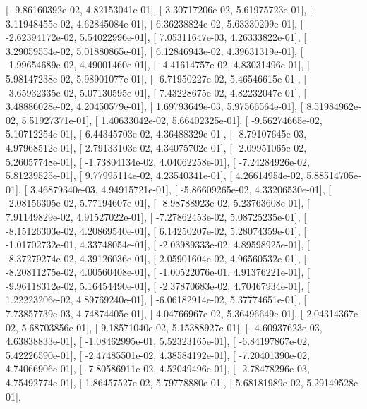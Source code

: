 \documentclass{article}
\begin{document}
       [ -9.86160392e-02,   4.82153041e-01],
       [  3.30717206e-02,   5.61975723e-01],
       [  3.11948455e-02,   4.62845084e-01],
       [  6.36238824e-02,   5.63330209e-01],
       [ -2.62394172e-02,   5.54022996e-01],
       [  7.05311647e-03,   4.26333822e-01],
       [  3.29059554e-02,   5.01880865e-01],
       [  6.12846943e-02,   4.39631319e-01],
       [ -1.99654689e-02,   4.49001460e-01],
       [ -4.41614757e-02,   4.83031496e-01],
       [  5.98147238e-02,   5.98901077e-01],
       [ -6.71950227e-02,   5.46546615e-01],
       [ -3.65932335e-02,   5.07130595e-01],
       [  7.43228675e-02,   4.82232047e-01],
       [  3.48886028e-02,   4.20450579e-01],
       [  1.69793649e-03,   5.97566564e-01],
       [  8.51984962e-02,   5.51927371e-01],
       [  1.40633042e-02,   5.66402325e-01],
       [ -9.56274665e-02,   5.10712254e-01],
       [  6.44345703e-02,   4.36488329e-01],
       [ -8.79107645e-03,   4.97968512e-01],
       [  2.79133103e-02,   4.34075702e-01],
       [ -2.09951065e-02,   5.26057748e-01],
       [ -1.73804134e-02,   4.04062258e-01],
       [ -7.24284926e-02,   5.81239525e-01],
       [  9.77995114e-02,   4.23540341e-01],
       [  4.26614954e-02,   5.88514705e-01],
       [  3.46879340e-03,   4.94915721e-01],
       [ -5.86609265e-02,   4.33206530e-01],
       [ -2.08156305e-02,   5.77194607e-01],
       [ -8.98788923e-02,   5.23763608e-01],
       [  7.91149829e-02,   4.91527022e-01],
       [ -7.27862453e-02,   5.08725235e-01],
       [ -8.15126303e-02,   4.20869540e-01],
       [  6.14250207e-02,   5.28074359e-01],
       [ -1.01702732e-01,   4.33748054e-01],
       [ -2.03989333e-02,   4.89598925e-01],
       [ -8.37279274e-02,   4.39126036e-01],
       [  2.05901604e-02,   4.96560532e-01],
       [ -8.20811275e-02,   4.00560408e-01],
       [ -1.00522076e-01,   4.91376221e-01],
       [ -9.96118312e-02,   5.16454490e-01],
       [ -2.37870683e-02,   4.70467934e-01],
       [  1.22223206e-02,   4.89769240e-01],
       [ -6.06182914e-02,   5.37774651e-01],
       [  7.73857739e-03,   4.74874405e-01],
       [  4.04766967e-02,   5.36496649e-01],
       [  2.04314367e-02,   5.68703856e-01],
       [  9.18571040e-02,   5.15388927e-01],
       [ -4.60937623e-03,   4.63838833e-01],
       [ -1.08462995e-01,   5.52323165e-01],
       [ -6.84197867e-02,   5.42226590e-01],
       [ -2.47485501e-02,   4.38584192e-01],
       [ -7.20401390e-02,   4.74066906e-01],
       [ -7.80586911e-02,   4.52049496e-01],
       [ -2.78478296e-03,   4.75492774e-01],
       [  1.86457527e-02,   5.79778880e-01],
       [  5.68181989e-02,   5.29149528e-01],
\end{document}
